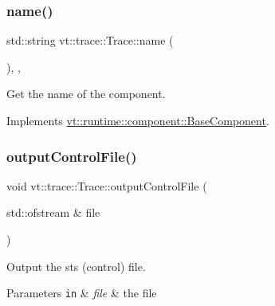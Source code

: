 \subsubsection{\texorpdfstring{name()}{name()}}
{\footnotesize\ttfamily std\+::string vt\+::trace\+::\+Trace\+::name (\begin{DoxyParamCaption}{ }\end{DoxyParamCaption})\hspace{0.3cm}{\ttfamily [inline]}, {\ttfamily [override]}, {\ttfamily [virtual]}}



Get the name of the component. 



Implements \hyperlink{structvt_1_1runtime_1_1component_1_1_base_component_a7701485f3539f78d42e6bad47fc7eb78}{vt\+::runtime\+::component\+::\+Base\+Component}.

\mbox{\label{structvt_1_1trace_1_1_trace_a90d5f7400d362293c78f041cb42fce35}} 
\subsubsection{\texorpdfstring{output\+Control\+File()}{outputControlFile()}}
{\footnotesize\ttfamily void vt\+::trace\+::\+Trace\+::output\+Control\+File (\begin{DoxyParamCaption}\item[{std\+::ofstream \&}]{file }\end{DoxyParamCaption})\hspace{0.3cm}{\ttfamily [private]}}



Output the sts (control) file. 


\begin{DoxyParams}[1]{Parameters}
\mbox{\tt in}  & {\em file} & the file \\
\hline
\end{DoxyParams}
\mbox{\label{structvt_1_1trace_1_1_trace_aefd9cc22457e4a086c0705f7a850375c}} 
